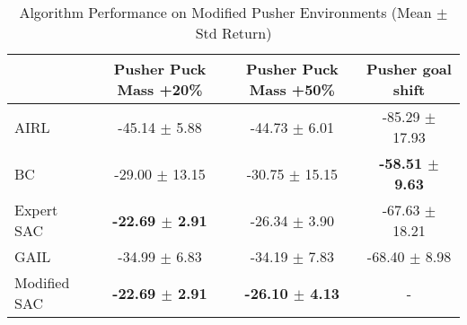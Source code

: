 
\begin{table}
\caption{Algorithm Performance on Modified Pusher Environments (Mean $\pm$ Std Return)}
\label{tab:perf_mod_pusher}
\begin{adjustbox}{max width=\textwidth, center}
\begin{tabular}{lccc}
\toprule
 & Pusher Puck Mass +20\% & Pusher Puck Mass +50\% & Pusher goal shift \\
\midrule
AIRL & -45.14 $\pm$ 5.88 & -44.73 $\pm$ 6.01 & -85.29 $\pm$ 17.93 \\
BC & -29.00 $\pm$ 13.15 & -30.75 $\pm$ 15.15 & \textbf{-58.51 $\pm$ 9.63} \\
Expert SAC & \textbf{-22.69 $\pm$ 2.91} & -26.34 $\pm$ 3.90 & -67.63 $\pm$ 18.21 \\
GAIL & -34.99 $\pm$ 6.83 & -34.19 $\pm$ 7.83 & -68.40 $\pm$ 8.98 \\
Modified SAC & \textbf{-22.69 $\pm$ 2.91} & \textbf{-26.10 $\pm$ 4.13} & - \\
\bottomrule
\end{tabular}
\end{adjustbox}
\end{table}